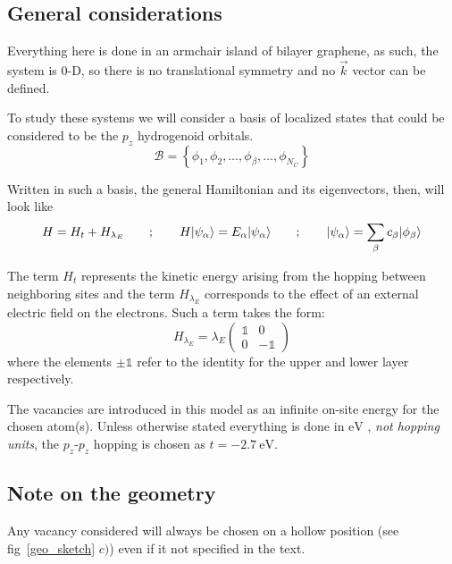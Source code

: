 \subsection{General considerations} %
Everything here is done in an armchair island of bilayer graphene, as such, the system is $0$-D, so there is no translational symmetry and no $\vec{k}$ vector can be defined.

To study these systems we will consider a basis of localized states that could be considered to be the $p_z$ hydrogenoid orbitals.
\begin{equation}
  \mathcal{B} = \left\{\phi_1,\phi_2,\dots,\phi_\beta,\dots,\phi_{N_C}\right\}
\end{equation}

Written in such a basis, the general Hamiltonian and its eigenvectors, then, will look like
\begin{equation}
  H = H_t + H_{\lambda_E} \quad\quad;\quad\quad
  H|\psi_\alpha\rangle = E_\alpha|\psi_\alpha\rangle \quad\quad;\quad\quad
  |\psi_\alpha\rangle = \sum_\beta c_\beta|\phi_\beta\rangle
\label{general}
\end{equation}


The term $H_t$ represents the kinetic energy arising from the hopping between neighboring sites and the term $H_{\lambda_E}$ corresponds to the effect of an external electric field on the electrons. Such a term takes the form:
\begin{equation}
  H_{\lambda_E} = \lambda_E
  \left(\begin{array}{cc}
  \mathds{1} & 0 \\
  0 & -\mathds{1}
  \end{array}\right)
\end{equation}
where the elements $\pm\mathds{1}$ refer to the identity for the upper and lower layer respectively.

The vacancies are introduced in this model as an infinite on-site energy for the chosen atom(s). Unless otherwise stated everything is done in $\si{\eV}$ %
, \emph{not hopping units}, the $p_z$-$p_z$ hopping is chosen as $t=\SI{-2.7}{\eV}$.





\subsection{Note on the geometry}
Any vacancy considered will always be chosen on a hollow position (see fig~\ref{geo_sketch} $c)$) even if it not specified in the text.

